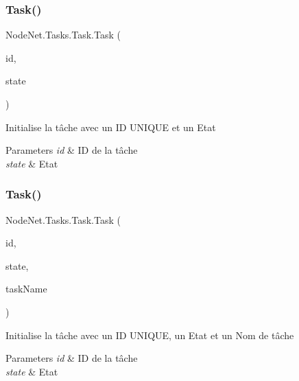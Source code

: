 \subsubsection{\texorpdfstring{Task()}{Task()}\hspace{0.1cm}{\footnotesize\ttfamily [1/2]}}
{\footnotesize\ttfamily Node\+Net.\+Tasks.\+Task.\+Task (\begin{DoxyParamCaption}\item[{int}]{id,  }\item[{\hyperlink{namespace_node_net_1_1_network_1_1_states_a0c130cd0043f8c509dddba2cf1fd2f36}{Node\+State}}]{state }\end{DoxyParamCaption})}



Initialise la tâche avec un ID U\+N\+I\+Q\+UE et un Etat 


\begin{DoxyParams}{Parameters}
{\em id} & ID de la tâche\\
\hline
{\em state} & Etat\\
\hline
\end{DoxyParams}
\mbox{\label{class_node_net_1_1_tasks_1_1_task_a860eaf574b2c7b69181d459c5ec3d4d3}} 
\subsubsection{\texorpdfstring{Task()}{Task()}\hspace{0.1cm}{\footnotesize\ttfamily [2/2]}}
{\footnotesize\ttfamily Node\+Net.\+Tasks.\+Task.\+Task (\begin{DoxyParamCaption}\item[{int}]{id,  }\item[{\hyperlink{namespace_node_net_1_1_network_1_1_states_a0c130cd0043f8c509dddba2cf1fd2f36}{Node\+State}}]{state,  }\item[{string}]{task\+Name }\end{DoxyParamCaption})}



Initialise la tâche avec un ID U\+N\+I\+Q\+UE, un Etat et un Nom de tâche 


\begin{DoxyParams}{Parameters}
{\em id} & ID de la tâche\\
\hline
{\em state} & Etat\\
\hline
\end{DoxyParams}


